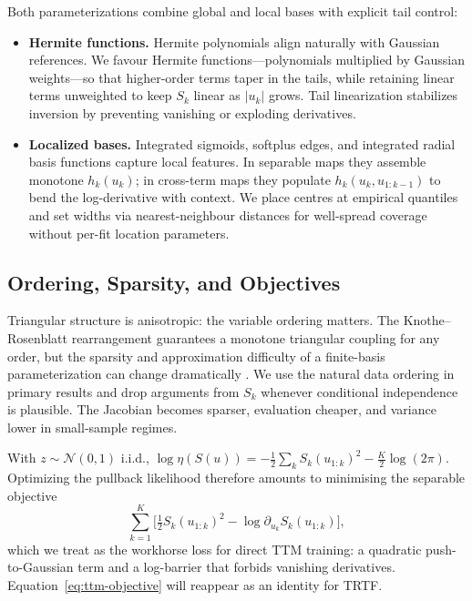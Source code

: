 \documentclass[11pt,a4paper,twoside]{book}\usepackage[]{graphicx}\usepackage[]{xcolor}
\begin{document}
Both parameterizations combine global and local bases with explicit tail control:
\begin{itemize}
  \item \textbf{Hermite functions.} Hermite polynomials align naturally with Gaussian references. We favour Hermite functions---polynomials multiplied by Gaussian weights---so that higher-order terms taper in the tails, while retaining linear terms unweighted to keep $S_k$ linear as $|u_k|$ grows. Tail linearization stabilizes inversion by preventing vanishing or exploding derivatives.
  \item \textbf{Localized bases.} Integrated sigmoids, softplus edges, and integrated radial basis functions capture local features. In separable maps they assemble monotone $h_k(u_k)$; in cross-term maps they populate $h_k(u_k,u_{1:k-1})$ to bend the log-derivative with context. We place centres at empirical quantiles and set widths via nearest-neighbour distances for well-spread coverage without per-fit location parameters.
\end{itemize}

\subsection{Ordering, Sparsity, and Objectives}

Triangular structure is anisotropic: the variable ordering matters. The Knothe--Rosenblatt rearrangement guarantees a monotone triangular coupling for any order, but the sparsity and approximation difficulty of a finite-basis parameterization can change dramatically \citep{rosenblatt1952remarks,knothe1957contributions}. We use the natural data ordering in primary results and drop arguments from $S_k$ whenever conditional independence is plausible. The Jacobian becomes sparser, evaluation cheaper, and variance lower in small-sample regimes.

With $z\sim \mathcal{N}(0,1)$ i.i.d., $\log \eta(S(u)) = -\tfrac{1}{2} \sum_k S_k(u_{1:k})^2 - \tfrac{K}{2}\log(2\pi)$. Optimizing the pullback likelihood therefore amounts to minimising the separable objective
\begin{equation}
  \sum_{k=1}^K \Big[ \tfrac{1}{2} S_k(u_{1:k})^2 - \log \partial_{u_k} S_k(u_{1:k}) \Big],
  \label{eq:ttm-objective}
\end{equation}
which we treat as the workhorse loss for direct TTM training: a quadratic push-to-Gaussian term and a log-barrier that forbids vanishing derivatives. Equation~\eqref{eq:ttm-objective} will reappear as an identity for TRTF.
\end{document}
